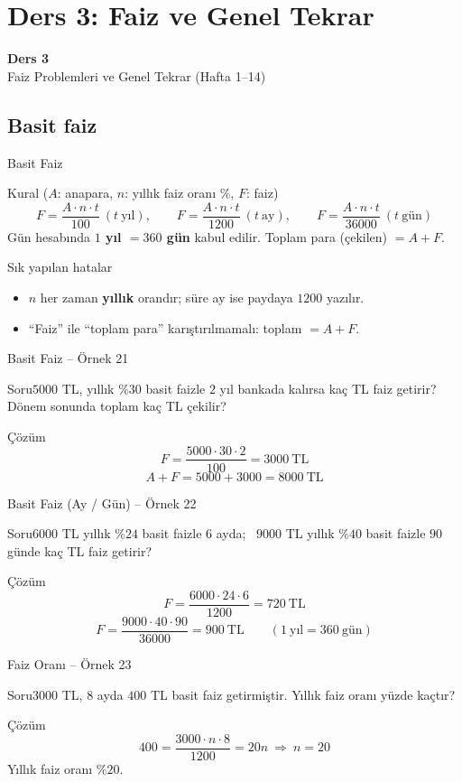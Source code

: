 \documentclass[aspectratio=169,11pt]{beamer}
\newcommand{\soru}[3]{%
\begin{frame}{#1}
  \begin{block}{Soru}\large #2\end{block}
  \pause
  \begin{exampleblock}{Çözüm}\large #3\end{exampleblock}
\end{frame}}
\begin{document}
\section{Ders 3: Faiz ve Genel Tekrar}
\begin{frame}
\centering\Large\color{anamavi}\textbf{Ders 3}\\[6pt]\normalsize Faiz Problemleri ve Genel Tekrar (Hafta 1--14)
\end{frame}

\subsection{Basit faiz}
\begin{frame}{Basit Faiz}
\begin{block}{Kural (\(A\): anapara, \(n\): yıllık faiz oranı \%, \(F\): faiz)}
\[F=\frac{A\cdot n\cdot t}{100}\ (t\ \text{yıl}),\qquad F=\frac{A\cdot n\cdot t}{1200}\ (t\ \text{ay}),\qquad F=\frac{A\cdot n\cdot t}{36000}\ (t\ \text{gün})\]
Gün hesabında \textbf{\(1\) yıl \(=360\) gün} kabul edilir. \qquad Toplam para (çekilen) \(=A+F\).
\end{block}
\begin{alertblock}{Sık yapılan hatalar}
\begin{itemize}
\item \(n\) her zaman \textbf{yıllık} orandır; süre ay ise paydaya \(1200\) yazılır.
\item ``Faiz'' ile ``toplam para'' karıştırılmamalı: toplam \(=A+F\).
\end{itemize}
\end{alertblock}
\end{frame}

\soru{Basit Faiz -- Örnek 21}
{\(5000\) TL, yıllık \(\%30\) basit faizle \(2\) yıl bankada kalırsa kaç TL faiz getirir? Dönem sonunda toplam kaç TL çekilir?}
{\[F=\frac{5000\cdot 30\cdot 2}{100}=3000\ \text{TL}\]
\[A+F=5000+3000=8000\ \text{TL}\]}

\soru{Basit Faiz (Ay / Gün) -- Örnek 22}
{\(6000\) TL yıllık \(\%24\) basit faizle \(6\) ayda; \ \(9000\) TL yıllık \(\%40\) basit faizle \(90\) günde kaç TL faiz getirir?}
{\[F=\frac{6000\cdot 24\cdot 6}{1200}=720\ \text{TL}\]
\[F=\frac{9000\cdot 40\cdot 90}{36000}=900\ \text{TL}\qquad(1\ \text{yıl}=360\ \text{gün})\]}

\soru{Faiz Oranı -- Örnek 23}
{\(3000\) TL, \(8\) ayda \(400\) TL basit faiz getirmiştir. Yıllık faiz oranı yüzde kaçtır?}
{\[400=\frac{3000\cdot n\cdot 8}{1200}=20n\ \Rightarrow\ n=20\]
Yıllık faiz oranı \(\%20\).}
\end{document}
